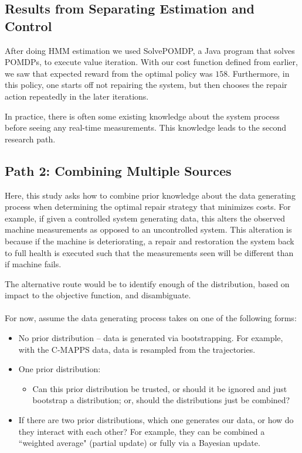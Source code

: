 \documentclass[english]{article}
\numberwithin{equation}{section}
\begin{document}
	\subsection*{Results from Separating Estimation and Control}
	After doing HMM estimation we used SolvePOMDP, a Java program that solves POMDPs, to execute value iteration. With our cost function defined from earlier, we saw that expected reward from the optimal policy was $158$. Furthermore, in this policy, one starts off not repairing the system, but then chooses the repair action repeatedly in the later iterations.
	
	In practice, there is often some existing knowledge about the system process before seeing any real-time measurements. This knowledge leads to the second research path.
	
	\subsection*{Path 2: Combining Multiple Sources}
	
	Here, this study asks how to combine prior knowledge about the data generating process when determining the optimal repair strategy that minimizes costs. For example, if given a controlled system generating data, this alters the observed machine measurements as opposed to an uncontrolled system. This alteration is because if the machine is deteriorating, a repair and restoration the system back to full health is executed such that the measurements seen will be different than if machine fails.
	
	The alternative route would be to identify enough of the distribution, based on impact to the objective function, and disambiguate. 
	\\
	\\
	For now, assume the data generating process takes on one of the following forms:
	\begin{itemize}
		\item No prior distribution -- data is generated via bootstrapping. For example, with the C-MAPPS data, data is resampled from the trajectories.
		\item One prior distribution:
		\begin{itemize}
			\item Can this prior distribution be trusted, or should it be ignored and just bootstrap a distribution; or, should the distributions just be combined?
		\end{itemize}
		\item If there are two prior distributions, which one generates our data, or how do they interact with each other? For example, they can be combined a ``weighted average" (partial update) or fully via a Bayesian update.
	\end{itemize}
	
\end{document}

